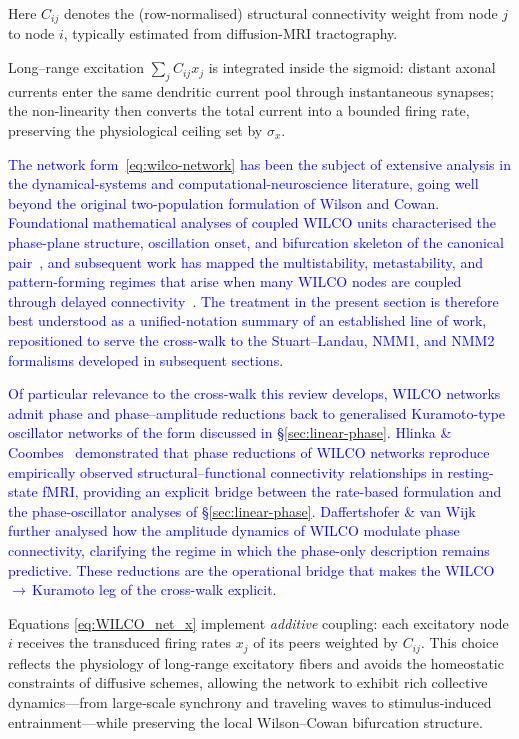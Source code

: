 \documentclass[12pt]{article}
\numberwithin{equation}{section}
\newcommand{\rev}[1]{\textcolor{blue}{#1}}
\begin{document}
Here  
\({C}_{ij}\) denotes the (row-normalised) structural connectivity weight from node \(j\) to node \(i\), typically estimated from diffusion-MRI tractography.  

Long–range excitation \(\sum_j C_{ij}x_j\) is integrated inside the sigmoid:  distant axonal currents enter the same dendritic current pool through instantaneous synapses; the non-linearity then converts the total current into a bounded firing rate, preserving the physiological ceiling set by \(\sigma_x\). 

\rev{The network form~\eqref{eq:wilco-network} has been the subject of extensive analysis in the dynamical-systems and computational-neuroscience literature, going well beyond the original two-population formulation of Wilson and Cowan. Foundational mathematical analyses of coupled WILCO units characterised the phase-plane structure, oscillation onset, and bifurcation skeleton of the canonical pair~\cite{borisyuk_kirillov_1992,hoppensteadt_izhikevich_1997}, and subsequent work has mapped the multistability, metastability, and pattern-forming regimes that arise when many WILCO nodes are coupled through delayed connectivity~\cite{daffertshofer_vanwijk_2011,coombes_byrne_2018}. The treatment in the present section is therefore best understood as a unified-notation summary of an established line of work, repositioned to serve the cross-walk to the Stuart--Landau, NMM1, and NMM2 formalisms developed in subsequent sections.}


\rev{Of particular relevance to the cross-walk this review develops, WILCO networks admit phase and phase--amplitude reductions back to generalised Kuramoto-type oscillator networks of the form discussed in \S\ref{sec:linear-phase}. Hlinka \& Coombes~\cite{hlinka_coombes_2012} demonstrated that phase reductions of WILCO networks reproduce empirically observed structural--functional connectivity relationships in resting-state fMRI, providing an explicit bridge between the rate-based formulation and the phase-oscillator analyses of \S\ref{sec:linear-phase}. Daffertshofer \& van Wijk~\cite{daffertshofer_vanwijk_2011} further analysed how the amplitude dynamics of WILCO modulate phase connectivity, clarifying the regime in which the phase-only description remains predictive. These reductions are the operational bridge that makes the WILCO\,$\to$\,Kuramoto leg of the cross-walk explicit.}


Equations \eqref{eq:WILCO_net_x}  implement \emph{additive} coupling: each excitatory node \(i\) receives the transduced firing rates \(x_j\) of its peers weighted by \(C_{ij}\). This choice reflects the physiology of long‐range excitatory fibers and avoids the homeostatic constraints of diffusive schemes, allowing the network to exhibit rich collective dynamics—from large‐scale synchrony and traveling waves to stimulus‐induced entrainment—while preserving the local Wilson–Cowan bifurcation structure.  
\end{document}
